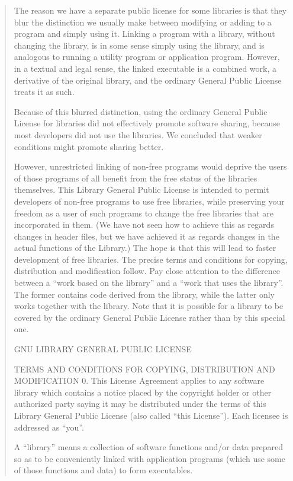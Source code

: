 \documentclass[
]{book}
\theoremstyle{definition}
\theoremstyle{definition}
\theoremstyle{definition}
\theoremstyle{definition}
\theoremstyle{remark}
\begin{document}
\begin{quote}
The reason we have a separate public license for some libraries
is that they blur the distinction we usually make between
modifying or adding to a program and simply using it. Linking a
program with a library, without changing the library, is in some
sense simply using the library, and is analogous to running a
utility program or application program. However, in a textual
and legal sense, the linked executable is a combined work, a
derivative of the original library, and the ordinary General
Public License treats it as such.

Because of this blurred distinction, using the ordinary General
Public License for libraries did not effectively promote
software sharing, because most developers did not use the
libraries. We concluded that weaker conditions might promote
sharing better.

However, unrestricted linking of non-free programs would deprive
the users of those programs of all benefit from the free status
of the libraries themselves. This Library General Public
License is intended to permit developers of non-free programs to
use free libraries, while preserving your freedom as a user of
such programs to change the free libraries that are incorporated
in them. (We have not seen how to achieve this as regards
changes in header files, but we have achieved it as regards
changes in the actual functions of the Library.) The hope is
that this will lead to faster development of free libraries.
The precise terms and conditions for copying, distribution and
modification follow. Pay close attention to the difference
between a ``work based on the library'' and a ``work that uses the
library''. The former contains code derived from the library,
while the latter only works together with the library.
Note that it is possible for a library to be covered by the
ordinary General Public License rather than by this special one.

GNU LIBRARY GENERAL PUBLIC LICENSE

TERMS AND CONDITIONS FOR COPYING, DISTRIBUTION AND MODIFICATION
0. This License Agreement applies to any software library which
contains a notice placed by the copyright holder or other
authorized party saying it may be distributed under the terms of
this Library General Public License (also called ``this
License''). Each licensee is addressed as ``you''.

A ``library'' means a collection of software functions and/or data
prepared so as to be conveniently linked with application
programs (which use some of those functions and data) to form
executables.


\end{quote}
\end{document}
